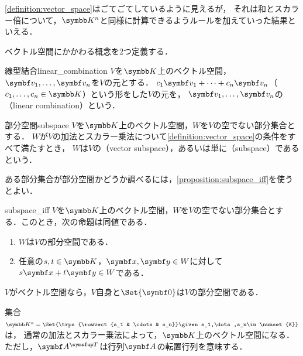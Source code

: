 \documentclass[../../main]{subfiles}
\begin{document}
\begin{note}
  \cref{definition:vector_space}はごてごてしているように見えるが，
  それは和とスカラー倍について，\(\numset{K}^n\)と同様に計算できるようルールを加えていった結果といえる．
\end{note}

ベクトル空間にかかわる概念を2つ定義する．

\begin{definition}{線型結合}{linear_combination}
  \(V\)を\(\numset{K}\)上のベクトル空間，\(\vect{v}_1,\dots,\vect{v}_n\)を\(V\)の元とする．
  \(c_1\vect{v}_1+\dots+c_n\vect{v}_n\)（\(c_1,\dots,c_n\in\numset{K}\)）という形をした\(V\)の元を，
  \(\vect{v}_1,\dots,\vect{v}_n\)の（linear combination）という．
\end{definition}

\begin{definition}{部分空間}{subspace}
  \(V\)を\(\numset{K}\)上のベクトル空間，\(W\)を\(V\)の空でない部分集合とする．
  \(W\)が\(V\)の加法とスカラー乗法について\cref{definition:vector_space}の条件をすべて満たすとき，
  \(W\)は\(V\)の（vector subspace），あるいは単に（subspace）であるという．    
\end{definition}

ある部分集合が部分空間かどうか調べるには，\cref{proposition:subspace_iff}を使うとよい．

\begin{proposition}{}{subspace_iff}
  \(V\)を\(\numset{K}\)上のベクトル空間，\(W\)を\(V\)の空でない部分集合とする．このとき，次の命題は同値である．
  \begin{enumerate}
    \item \(W\)は\(V\)の部分空間である．
    \item 任意の\(s,t\in\numset{K}\)，\(\vect{x},\vect{y}\in W\)に対して\(s\vect{x}+t\vect{y}\in W\)である．
  \end{enumerate}
\end{proposition}

\begin{example}
  \(V\)がベクトル空間なら，\(V\)自身と\(\Set{\zvec}\)は\(V\)の部分空間である．
\end{example}

\begin{example}
  集合\(\numset{K}^n=\Set{\trps{\rowvect{s_1 & \cdots & s_n}}\given s_1,\dots,s_n\in\numset{K}}\)は，
  通常の加法とスカラー乗法によって，\(\numset{K}\)上のベクトル空間になる．ただし，\(\trps{\mat{A}}\)は行列\(\mat{A}\)の転置行列を意味する．
\end{example}
\end{document}
